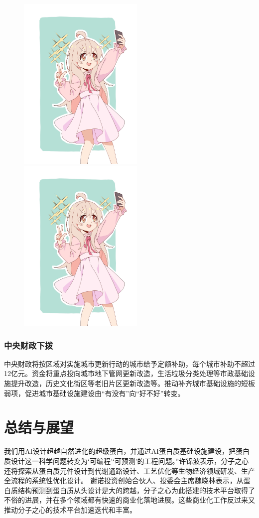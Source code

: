 \begin{figure}[htbp!]
	\centering
	\includegraphics[width=6cm]{图片/sample.jpg}
	\qquad
	\includegraphics[width=6cm]{图片/sample.jpg}
\end{figure}

\subsubsection{中央财政下拨}
中央财政将按区域对实施城市更新行动的城市给予定额补助，每个城市补助不超过12亿元。资金将重点投向城市地下管网更新改造，生活垃圾分类处理等市政基础设施提升改造，历史文化街区等老旧片区更新改造等。推动补齐城市基础设施的短板弱项，促进城市基础设施建设由“有没有”向“好不好”转变\cite{caimin2006,Peebles2001-100-100,Alice13}。

\section{总结与展望}
我们用AI设计超越自然进化的超级蛋白，并通过AI蛋白质基础设施建设，把蛋白质设计这一科学问题转变为‘可编程’‘可预测’的工程问题。”许锦波表示，分子之心还将探索从蛋白质元件设计到代谢通路设计\cite{jin1993}、工艺优化等生物经济领域研发、生产全流程的系统性优化设计。
谢诺投资创始合伙人、投委会主席魏晓林表示，从蛋白质结构预测到蛋白质从头设计是大的跨越，分子之心为此搭建的技术平台取得了不俗的进展，并在多个领域都有快速的商业化落地进展。这些商业化工作反过来又推动分子之心的技术平台加速迭代和丰富\cite{gill1985}。

